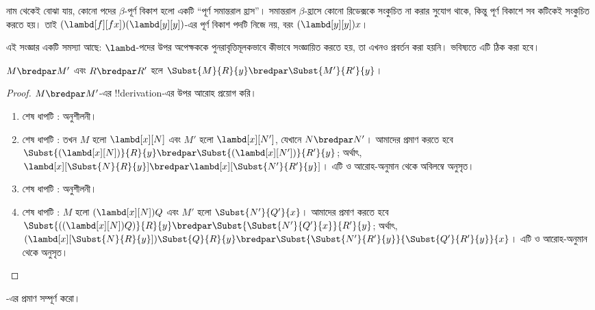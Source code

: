 \documentclass[../../../include/open-logic-section]{subfiles}
\begin{document}
নাম থেকেই বোঝা যায়, কোনো পদের $\beta$-পূর্ণ বিকাশ হলো একটি “পূর্ণ
সমান্তরাল হ্রাস”। সমান্তরাল $\beta$-হ্রাসে কোনো রিডেক্সকে সংকুচিত না
করার সুযোগ থাকে, কিন্তু পূর্ণ বিকাশে সব কটিকেই সংকুচিত করতে হয়। তাই
$(\lambd[f][fx])(\lambd[y][y])$-এর পূর্ণ বিকাশ পদটি নিজে নয়, বরং
$(\lambd[y][y])x$।

\begin{editorial}
  এই সংজ্ঞার একটি সমস্যা আছে: $\lambd$-পদের উপর অপেক্ষককে
  পুনরাবৃত্তিমূলকভাবে কীভাবে সংজ্ঞায়িত করতে হয়, তা এখনও প্রবর্তন করা
  হয়নি। ভবিষ্যতে এটি ঠিক করা হবে।
\end{editorial}

\begin{lem}
  $M \bredpar M'$ এবং $R \bredpar R'$ হলে $\Subst{M}{R}{y}
  \bredpar \Subst{M'}{R'}{y}$।
\end{lem}

\begin{proof}
  $M \bredpar M'$-এর !!{derivation}-এর উপর আরোহ প্রয়োগ করি।
  \begin{enumerate}
    \item শেষ ধাপটি : অনুশীলনী।
    \item শেষ ধাপটি : তখন $M$ হলো
      $\lambd[x][N]$ এবং $M'$ হলো $\lambd[x][N']$,
      যেখানে $N \bredpar N'$। আমাদের প্রমাণ করতে হবে
      $\Subst{(\lambd[x][N])}{R}{y} \bredpar
      \Subst{(\lambd[x][N'])}{R'}{y}$; অর্থাৎ,
      $\lambd[x][\Subst{N}{R}{y}] \bredpar
      \lambd[x][\Subst{N'}{R'}{y}]$। এটি  ও
      আরোহ-অনুমান থেকে অবিলম্বে অনুসৃত।
    \item শেষ ধাপটি : অনুশীলনী।
    \item শেষ ধাপটি : $M$ হলো
      $(\lambd[x][N])Q$ এবং $M'$ হলো $\Subst{N'}{Q'}{x}$। আমাদের
      প্রমাণ করতে হবে $\Subst{((\lambd[x][N])Q)}{R}{y} \bredpar
      \Subst{\Subst{N'}{Q'}{x}}{R'}{y}$; অর্থাৎ,
      $(\lambd[x][\Subst{N}{R}{y}])\Subst{Q}{R}{y} \bredpar
      \Subst{\Subst{N'}{R'}{y}}{\Subst{Q'}{R'}{y}}{x}$। এটি
       ও আরোহ-অনুমান থেকে অনুসৃত।
  \end{enumerate}
\end{proof}

\begin{prob}
  -এর প্রমাণ সম্পূর্ণ করো।
\end{prob}
\end{document}
